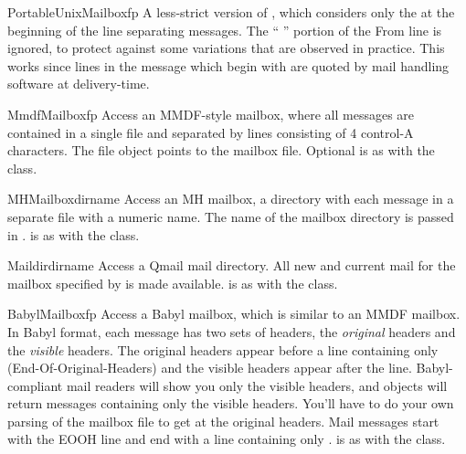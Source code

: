 \begin{classdesc}{PortableUnixMailbox}{fp}
A less-strict version of , which considers only the
 at the beginning of the line separating messages.  The
`` '' portion of the From line is ignored, to
protect against some variations that are observed in practice.  This
works since lines in the message which begin with  are
quoted by mail handling software at delivery-time.
\end{classdesc}

\begin{classdesc}{MmdfMailbox}{fp}
Access an MMDF-style mailbox, where all messages are contained
in a single file and separated by lines consisting of 4 control-A
characters.  The file object  points to the mailbox file.
Optional  is as with the  class.
\end{classdesc}

\begin{classdesc}{MHMailbox}{dirname}
Access an MH mailbox, a directory with each message in a separate
file with a numeric name.
The name of the mailbox directory is passed in .
 is as with the  class.
\end{classdesc}

\begin{classdesc}{Maildir}{dirname}
Access a Qmail mail directory.  All new and current mail for the
mailbox specified by  is made available.
 is as with the  class.
\end{classdesc}

\begin{classdesc}{BabylMailbox}{fp}
Access a Babyl mailbox, which is similar to an MMDF mailbox.  In
Babyl format, each message has two sets of headers, the
\emph{original} headers and the \emph{visible} headers.  The original
headers appear before a line containing only 
(End-Of-Original-Headers) and the visible headers appear after the
 line.  Babyl-compliant mail readers will show you only the
visible headers, and  objects will return messages
containing only the visible headers.  You'll have to do your own
parsing of the mailbox file to get at the original headers.  Mail
messages start with the EOOH line and end with a line containing only
.   is as with the
 class.
\end{classdesc}

